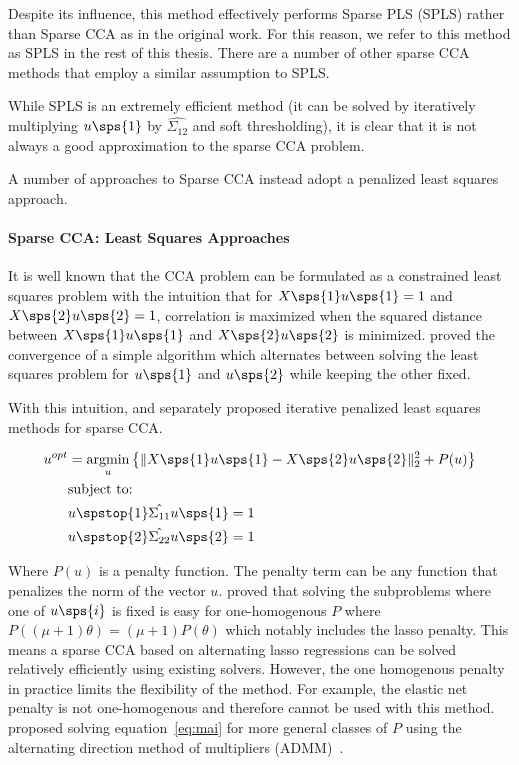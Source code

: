 Despite its influence, this method effectively performs Sparse PLS (SPLS) rather than Sparse CCA as in the original work.
For this reason, we refer to this method as SPLS in the rest of this thesis.
There are a number of other sparse CCA methods that employ a similar assumption to SPLS\citep{parkhomenko2009sparse, waaijenborg2008quantifying}.

While SPLS is an extremely efficient method (it can be solved by iteratively multiplying $u\sps{1}$ by $\hat{\Sigma_{12}}$ and soft thresholding), it is clear that it is not always a good approximation to the sparse CCA problem.

A number of approaches to Sparse CCA instead adopt a penalized least squares approach.

\paragraph{Sparse CCA: Least Squares Approaches}

It is well known that the CCA problem can be formulated as a constrained least squares problem with the intuition that
for \(X\sps{1} u\sps{1}=1\) and \(X\sps{2} u\sps{2}=1\), correlation is maximized when the squared distance
between \(X\sps{1} u\sps{1}\) and \(X\sps{2} u\sps{2}\) is minimized. \citep{golub1995canonical} proved the
convergence of a simple algorithm which alternates between solving the least squares problem for \(u\sps{1}\) and
\(u\sps{2}\) while keeping the other fixed.

With this intuition, \cite{wilms2015sparse} and \cite{mai2019iterative} separately proposed iterative penalized least
squares methods for sparse CCA\@.

\begin{align}
    \label{eq:mai}
    u^{opt} &= \underset{u}{\mathrm{argmin}} \left\{ \|X\sps{1}u\sps{1} - X\sps{2}u\sps{2}\|_2^2 + P(u) \right\} \\
    &\text{subject to:} \notag \\
    &u\spstop{1} \hat{\Sigma_{11}} u\sps{1}=1 \notag \\
    &u\spstop{2} \hat{\Sigma_{22}} u\sps{2}=1 \notag
\end{align}

Where \(P(u)\) is a penalty function.
The penalty term can be any function that penalizes the norm of the vector \(u\).
\citep{mai2019iterative} proved that solving the subproblems where one of $u\sps{i}$ is fixed is easy for one-homogenous $P$ where
\( P((\mu + 1)\theta) = (\mu + 1)P(\theta) \) which notably includes the lasso penalty.
This means a sparse CCA based
on alternating lasso regressions can be solved relatively efficiently using existing solvers.
However, the one homogenous penalty in practice limits the flexibility of the method.
For example, the elastic net penalty is not one-homogenous and therefore cannot be used with this method.\citep{
    kanatsoulis2018structured} proposed solving equation~\ref{eq:mai} for more general classes of $P$ using the
alternating direction method of multipliers (ADMM)~\citep{boyd2011distributed}.

